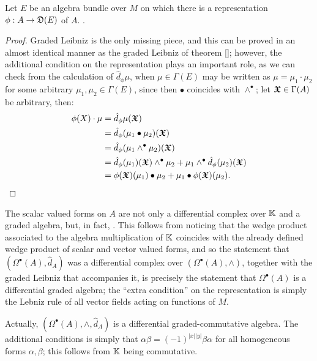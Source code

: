 \begin{theorem} \label{theoFormsAreDiffGAlgebebra}
Let $E$ be an algebra bundle over $M$ on which there is a representation $\phi: A \to \alg D(E)$ of $A$. .
\end{theorem}

\begin{proof}
Graded Leibniz is the only missing piece, and this can be proved in an almost identical manner as the graded Leibniz of theorem \ref{}; however, the additional condition on the representation plays an important role, as we can check from the calculation of $\hat d_\phi \mu$, when $\mu \in \Gamma(E)$ may be written as $\mu = \mu_1 \cdot \mu_2$ for some arbitrary $\mu_1, \mu_2 \in \Gamma(E)$, since then $\bullet$ coincides with $\wedge^\bullet$; let $\bm{\mathfrak{X}} \in \Gamma(A)$ be arbitrary, then:
\begin{align*}
    \phi(X) \cdot \mu &= \hat d_\phi \mu(\sectoid X)\\
        &= \hat d_\phi (\mu_1 \bullet \mu_2)(\sectoid X) \\
        &= \hat d_\phi (\mu_1 \wedge^\bullet \mu_2)(\sectoid X)\\
        &= \hat d_\phi(\mu_1)(\sectoid X) \wedge^\bullet \mu_2 + \mu_1 \wedge^\bullet \hat d_\phi(\mu_2)(\sectoid X)\\
        &= \phi(\sectoid X)(\mu_1) \bullet \mu_2 + \mu_1 \bullet \phi(\sectoid X)(\mu_2).
\end{align*}

\end{proof}

\begin{example}
The scalar valued forms on $A$ are not only a differential complex over $\mathbb{K}$ and a graded algebra, but, in fact, . This follows from noticing that the wedge product associated to the algebra multiplication of $\mathbb{K}$ coincides with the already defined wedge product of scalar and vector valued forms, and so the statement that $(\Omega^\bullet(A), \hat d_A)$ was a differential complex over $(\Omega^\bullet(A), \wedge)$, together with the graded Leibniz that accompanies it, is precisely the statement that $\Omega^\bullet(A)$ is a differential graded algebra; the ``extra condition'' on the representation is simply the Lebniz rule of all vector fields acting on functions of $M$.

Actually, $(\Omega^\bullet(A), \wedge, \hat d_A)$ is a differential graded-commutative algebra. The additional conditions is simply that $\alpha \beta = (-1)^{|x||y|}\beta \alpha$ for all homogeneous forms $\alpha, \beta$; this follows from $\mathbb{K}$ being commutative.
\end{example}

